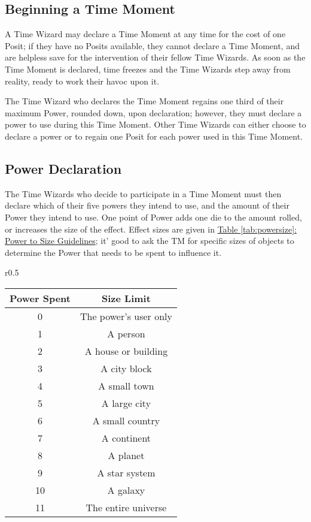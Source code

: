 \documentclass{article}
\begin{document}
\subsection{Beginning a Time Moment} \label{ssec:begin-moment}
A Time Wizard may declare a Time Moment at any time for the cost of one Posit; if they have no
Posits available, they cannot declare a Time Moment, and are helpless save for the intervention
of their fellow Time Wizards. As soon as the Time Moment is declared, time freezes and the
Time Wizards step away from reality, ready to work their havoc upon it.

The Time Wizard who declares the Time Moment regains one third of their maximum Power, rounded
down, upon declaration; however, they must declare a power to use during this Time Moment. Other
Time Wizards can either choose to declare a power or to regain one Posit for each power used in
this Time Moment.

\subsection{Power Declaration} \label{ssec:power-declaration}
The Time Wizards who decide to participate in a Time Moment must then declare which of their
five powers they intend to use, and the amount of their Power they intend to use. One point of
Power adds one die to the amount rolled, or increases the size of the effect. Effect sizes are
given in \hyperref[tab:powersize]{Table \ref*{tab:powersize}: Power to Size Guidelines}; it'
good to ask the TM for specific sizes of objects to determine the Power that needs to be spent
to influence it.

\begin{wraptable}{r}{0.5\textwidth}
   \caption{Power to Size Guidelines}
   \label{tab:powersize}

   \begin{tabular}{c|c}
      \textbf{Power Spent} & {Size Limit}\\ \hline
      0 & The power's user only\\
      1 & A person\\
      2 & A house or building\\
      3 & A city block\\
      4 & A small town\\
      5 & A large city\\
      6 & A small country\\
      7 & A continent\\
      8 & A planet\\
      9 & A star system\\
      10 & A galaxy\\
      11 & The entire universe
   \end{tabular}
\end{wraptable}
\end{document}
